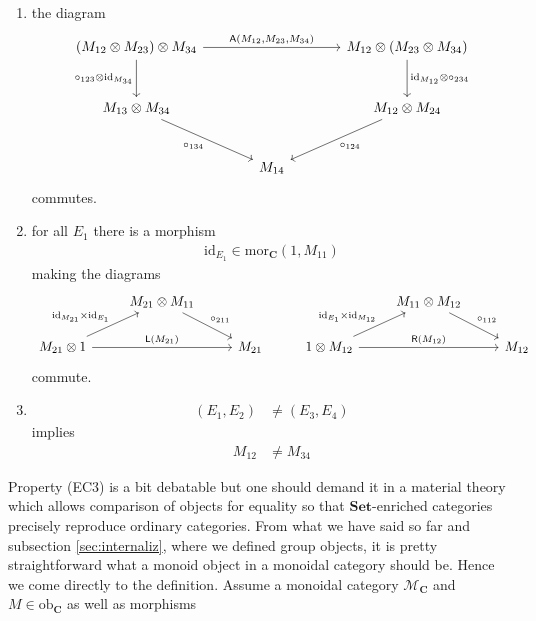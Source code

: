 \begin{enumerate}
\item[(EC1)]
the diagram
\[
\begin{tikzcd}[sep=large]
  \left(
    M_{12}
    \otimes
    M_{23}
  \right)
  \otimes
  M_{34}
  \arrow{rr}{\mathsf{A}(M_{12},M_{23},M_{34})}
  \arrow[swap]{d}{\circ_{123} \otimes \mathrm{id}_{M_{34}}}
  &
  &
  M_{12}
  \otimes
  \left(
    M_{23}
    \otimes
    M_{34}
  \right)
  \arrow{d}{\mathrm{id}_{M_{12}} \otimes \circ_{234}}
  \\
  M_{13}
  \otimes
  M_{34}
  \arrow[swap]{dr}{\circ_{134}}
  &
  &
  M_{12}
  \otimes
  M_{24}
  \arrow{dl}{\circ_{124}}
  \\
  &
  M_{14}
  &
\end{tikzcd}
\]
commutes.
\item[(EC2)]
for all $E_{1}$ there is a morphism
\begin{align*}
  \mathrm{id}_{E_{1}}
  \in
  \mathrm{mor}_{\mathbf{C}}(1,M_{11})
\end{align*}
making the diagrams
\[
\begin{tikzcd}[sep=normal]
  &
  M_{21}
  \otimes
  M_{11}
  \arrow{dr}{\circ_{211}}
  &
  &
  &
  M_{11}
  \otimes
  M_{12}
  \arrow{dr}{\circ_{112}}
  &
  \\
  M_{21}
  \otimes
  1
  \arrow{ur}{\mathrm{id}_{M_{21}} \times \mathrm{id}_{E_{1}}}
  \arrow{rr}{\mathsf{L}(M_{21})}
  &
  &
  M_{21}
  &
  1
  \otimes
  M_{12}
  \arrow{ur}{\mathrm{id}_{E_{1}} \times \mathrm{id}_{M_{12}}}
  \arrow{rr}{\mathsf{R}(M_{12})}
  &
  &
  M_{12}
\end{tikzcd}
\]
commute.
\item[(EC3)]
\begin{align*}
  (E_{1},E_{2})
  &\neq
  (E_{3},E_{4})
\end{align*}
implies
\begin{align*}
  M_{12}
  &\neq
  M_{34}
\end{align*}
\end{enumerate}
Property (EC3) is a bit debatable but one should demand it in a material theory which allows comparison of objects for equality so that $\mathbf{Set}$-enriched categories precisely reproduce ordinary categories.
From what we have said so far and subsection \ref{sec:internaliz}, where we defined group objects, it is pretty straightforward what a monoid object in a monoidal category should be.
Hence we come directly to the definition.
Assume a monoidal category $\mathcal{M}_{\mathbf{C}}$ and $M \in \mathrm{ob}_{\mathbf{C}}$ as well as morphisms
